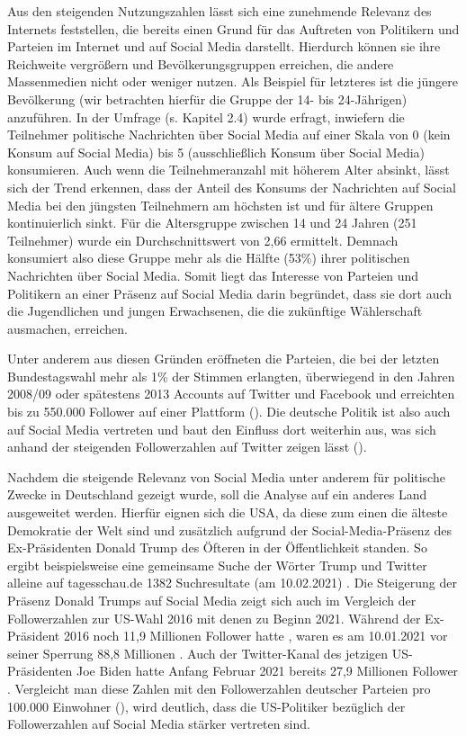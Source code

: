 Aus den steigenden Nutzungszahlen lässt sich eine zunehmende Relevanz des Internets feststellen, die bereits einen Grund für das Auftreten von Politikern und Parteien im Internet und auf Social Media darstellt. Hierdurch können sie ihre Reichweite vergrößern und Bevölkerungsgruppen erreichen, die andere Massenmedien nicht oder weniger nutzen. Als Beispiel für letzteres ist die jüngere Bevölkerung (wir betrachten hierfür die Gruppe der 14- bis 24-Jährigen) anzuführen. 
In der Umfrage (s. Kapitel 2.4) wurde erfragt, inwiefern die Teilnehmer politische Nachrichten über Social Media auf einer Skala von 0 (kein Konsum auf Social Media) bis 5 (ausschließlich Konsum über Social Media) konsumieren. Auch wenn die Teilnehmeranzahl mit höherem Alter absinkt, lässt sich der Trend erkennen, dass der Anteil des Konsums der Nachrichten auf Social Media bei den jüngsten Teilnehmern am höchsten ist und für ältere Gruppen kontinuierlich sinkt. Für die Altersgruppe zwischen 14 und 24 Jahren (251 Teilnehmer) wurde ein Durchschnittswert von 2,66 ermittelt. Demnach konsumiert also diese Gruppe mehr als die Hälfte (53\%) ihrer politischen Nachrichten über Social Media. Somit liegt das Interesse von Parteien und Politikern an einer Präsenz auf Social Media darin begründet, dass sie dort auch die Jugendlichen und jungen Erwachsenen, die die zukünftige Wählerschaft ausmachen, erreichen.

Unter anderem aus diesen Gründen eröffneten die Parteien, die bei der letzten Bundestagswahl mehr als 1\% der Stimmen erlangten, überwiegend in den Jahren 2008/09 oder spätestens 2013 Accounts auf Twitter und Facebook und erreichten bis zu 550.000 Follower auf einer Plattform (\autocite[]{tab:parteienSocialMedia}). Die deutsche Politik ist also auch auf Social Media vertreten und baut den Einfluss dort weiterhin aus, was sich anhand der steigenden Followerzahlen auf Twitter zeigen lässt (\autocite[]{tab:parteienSocialMedia}). 

Nachdem die steigende Relevanz von Social Media unter anderem für politische Zwecke in Deutschland gezeigt wurde, soll die Analyse auf ein anderes Land ausgeweitet werden. Hierfür eignen sich die USA, da diese zum einen die älteste Demokratie der Welt \autocite[vgl.][]{ÄltesteDemokrUSA} sind und zusätzlich aufgrund der Social-Media-Präsenz des Ex-Präsidenten Donald Trump des Öfteren in der Öffentlichkeit standen. So ergibt beispielsweise eine gemeinsame Suche der Wörter \glqq Trump\grqq{} und \glqq Twitter\grqq{} alleine auf tagesschau.de 1382 Suchresultate (am 10.02.2021) \autocite[vgl.][]{SearchTagesschau}. 
Die Steigerung der Präsenz Donald Trumps auf Social Media zeigt sich auch im Vergleich der Followerzahlen zur US-Wahl 2016 mit denen zu Beginn 2021. Während der Ex-Präsident 2016 noch 11,9 Millionen Follower hatte \autocite[vgl.][]{2016TrumpTwitter}, waren es am 10.01.2021 vor seiner Sperrung 88,8 Millionen \autocite[vgl.][]{2021TrumpTwitter}. Auch der Twitter-Kanal des jetzigen US-Präsidenten Joe Biden hatte Anfang Februar 2021 bereits 27,9 Millionen Follower \autocite[vgl.][]{JoeBidenTwitter}. Vergleicht man diese Zahlen mit den Followerzahlen deutscher Parteien pro 100.000 Einwohner (\autocite[]{tab:trumpdeutschland}), wird deutlich, dass die US-Politiker bezüglich der Followerzahlen auf Social Media stärker vertreten sind. 

